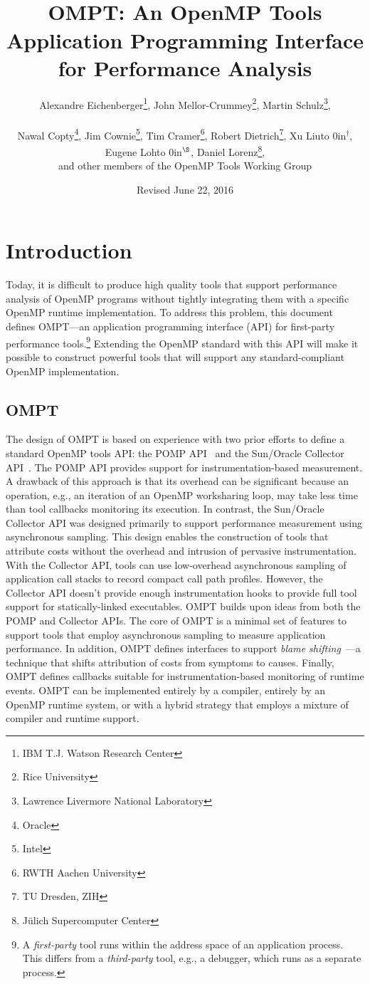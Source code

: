 \documentclass{article}
\title{OMPT: An OpenMP\textsuperscript{\textregistered} Tools Application Programming Interface for Performance Analysis}
\author{Alexandre Eichenberger\thanks{IBM T.J. Watson Research Center}, 
John Mellor-Crummey\thanks{Rice University}, 
Martin Schulz\thanks{Lawrence Livermore National Laboratory},
\\~\\
Nawal Copty\thanks{Oracle}, 
Jim Cownie\thanks{Intel},
Tim Cramer\thanks{RWTH Aachen University}, 
Robert Dietrich\thanks{TU Dresden, ZIH},
Xu Liu\hbox to 0in{$^\dagger$\hss},
Eugene Loh\hbox to 0in{$^\S$\hss}, 
Daniel Lorenz\thanks{J\"{u}lich Supercomputer Center}, 
\\
and other members of the OpenMP Tools Working Group}
\date{Revised June 22, 2016}
\begin{document}
  

                                           
\maketitle
\section{Introduction}
Today, it is difficult to produce high quality tools that support 
performance analysis of OpenMP programs without tightly integrating them with a specific OpenMP runtime implementation. To address this problem, this document defines OMPT---an application programming interface (API) for first-party performance tools.\footnote{A {\em first-party} tool runs within the address space of an application process. This differs from a {\em third-party} tool, e.g., a debugger, which runs as a separate process.}  
Extending the OpenMP standard with this API  will make it possible to construct powerful tools that will support any standard-compliant OpenMP implementation.

\subsection{OMPT}

The design of OMPT is based on experience with two prior efforts to define a standard OpenMP tools API: the POMP API~\cite{Mohr:EWOMP02} and the Sun/Oracle Collector API~\cite{SunCollector,Jost:2005:AND:1892830.1892858}. 
The POMP API provides support for instrumentation-based measurement. A drawback of this approach  is that its overhead can be significant because an operation, e.g., an iteration of an OpenMP worksharing loop, may take less time than tool callbacks monitoring its execution. 
In contrast, 
the Sun/Oracle Collector API was  designed primarily to support performance measurement 
using asynchronous sampling. This  design enables the construction of tools that attribute costs without the overhead and intrusion of pervasive instrumentation. With the Collector API, tools
 can use low-overhead asynchronous  sampling of application call stacks to record compact call path profiles. However, the Collector API doesn't provide enough instrumentation hooks to provide full tool support for statically-linked executables.
OMPT builds upon ideas from both the POMP and  Collector APIs. The core of OMPT is a minimal set of features to support tools that employ asynchronous sampling to measure application performance. In addition, OMPT defines  interfaces to support  {\em blame shifting}~\cite{Tallent:PPoPP09,Tallent:PPoPP10}---a technique that shifts attribution of costs from symptoms to causes.
Finally, OMPT defines callbacks suitable for instrumentation-based monitoring of runtime events. 
 OMPT can be implemented entirely by a compiler, entirely by an OpenMP runtime system, or with a hybrid strategy that employs a mixture of compiler and runtime support.
\end{document}
